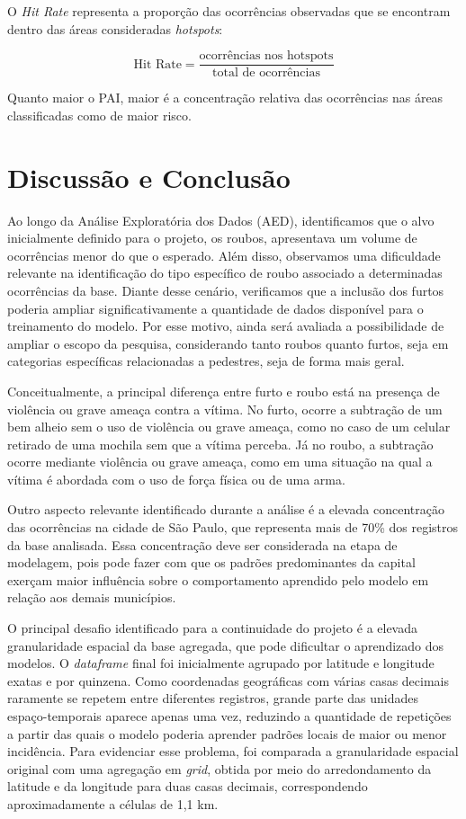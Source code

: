 \documentclass[12pt]{article}
\begin{document}
O \textit{Hit Rate} representa a proporção das ocorrências observadas que se encontram dentro das áreas consideradas \textit{hotspots}:

\[
\text{Hit Rate} =
\frac{\text{ocorrências nos hotspots}}{\text{total de ocorrências}}
\]

Quanto maior o PAI, maior é a concentração relativa das ocorrências nas áreas classificadas como de maior risco.

\vspace{1.2cm}

\section{Discussão e Conclusão}

Ao longo da Análise Exploratória dos Dados (AED), identificamos que o alvo inicialmente definido para o projeto, os roubos, apresentava um volume de ocorrências menor do que o esperado. Além disso, observamos uma dificuldade relevante na identificação do tipo específico de roubo associado a determinadas ocorrências da base. Diante desse cenário, verificamos que a inclusão dos furtos poderia ampliar significativamente a quantidade de dados disponível para o treinamento do modelo. Por esse motivo, ainda será avaliada a possibilidade de ampliar o escopo da pesquisa, considerando tanto roubos quanto furtos, seja em categorias específicas relacionadas a pedestres, seja de forma mais geral.

Conceitualmente, a principal diferença entre furto e roubo está na presença de violência ou grave ameaça contra a vítima. No furto, ocorre a subtração de um bem alheio sem o uso de violência ou grave ameaça, como no caso de um celular retirado de uma mochila sem que a vítima perceba. Já no roubo, a subtração ocorre mediante violência ou grave ameaça, como em uma situação na qual a vítima é abordada com o uso de força física ou de uma arma.

Outro aspecto relevante identificado durante a análise é a elevada concentração das ocorrências na cidade de São Paulo, que representa mais de 70\% dos registros da base analisada. Essa concentração deve ser considerada na etapa de modelagem, pois pode fazer com que os padrões predominantes da capital exerçam maior influência sobre o comportamento aprendido pelo modelo em relação aos demais municípios.

O principal desafio identificado para a continuidade do projeto é a elevada granularidade espacial da base agregada, que pode dificultar o aprendizado dos modelos. O \textit{dataframe} final foi inicialmente agrupado por latitude e longitude exatas e por quinzena. Como coordenadas geográficas com várias casas decimais raramente se repetem entre diferentes registros, grande parte das unidades espaço-temporais aparece apenas uma vez, reduzindo a quantidade de repetições a partir das quais o modelo poderia aprender padrões locais de maior ou menor incidência. Para evidenciar esse problema, foi comparada a granularidade espacial original com uma agregação em \textit{grid}, obtida por meio do arredondamento da latitude e da longitude para duas casas decimais, correspondendo aproximadamente a células de 1,1 km.
\end{document}

